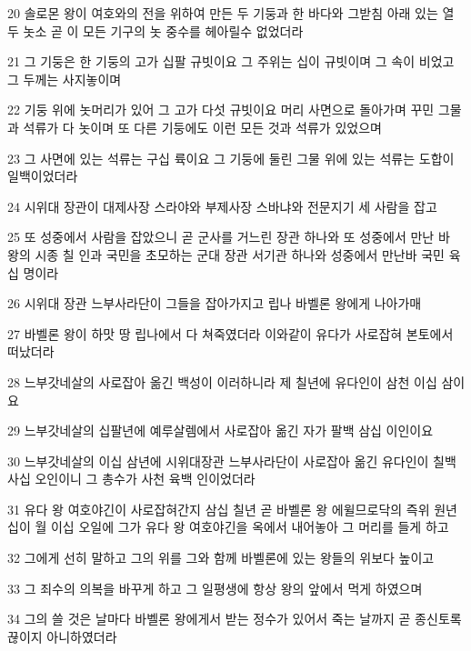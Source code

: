 \par 20 솔로몬 왕이 여호와의 전을 위하여 만든 두 기둥과 한 바다와 그받침 아래 있는 열 두 놋소 곧 이 모든 기구의 놋 중수를 헤아릴수 없었더라
\par 21 그 기둥은 한 기둥의 고가 십팔 규빗이요 그 주위는 십이 규빗이며 그 속이 비었고 그 두께는 사지놓이며
\par 22 기둥 위에 놋머리가 있어 그 고가 다섯 규빗이요 머리 사면으로 돌아가며 꾸민 그물과 석류가 다 놋이며 또 다른 기둥에도 이런 모든 것과 석류가 있었으며
\par 23 그 사면에 있는 석류는 구십 륙이요 그 기둥에 둘린 그물 위에 있는 석류는 도합이 일백이었더라
\par 24 시위대 장관이 대제사장 스라야와 부제사장 스바냐와 전문지기 세 사람을 잡고
\par 25 또 성중에서 사람을 잡았으니 곧 군사를 거느린 장관 하나와 또 성중에서 만난 바 왕의 시종 칠 인과 국민을 초모하는 군대 장관 서기관 하나와 성중에서 만난바 국민 육십 명이라
\par 26 시위대 장관 느부사라단이 그들을 잡아가지고 립나 바벨론 왕에게 나아가매
\par 27 바벨론 왕이 하맛 땅 립나에서 다 쳐죽였더라 이와같이 유다가 사로잡혀 본토에서 떠났더라
\par 28 느부갓네살의 사로잡아 옮긴 백성이 이러하니라 제 칠년에 유다인이 삼천 이십 삼이요
\par 29 느부갓네살의 십팔년에 예루살렘에서 사로잡아 옮긴 자가 팔백 삼십 이인이요
\par 30 느부갓네살의 이십 삼년에 시위대장관 느부사라단이 사로잡아 옮긴 유다인이 칠백 사십 오인이니 그 총수가 사천 육백 인이었더라
\par 31 유다 왕 여호야긴이 사로잡혀간지 삼십 칠년 곧 바벨론 왕 에윌므로닥의 즉위 원년 십이 월 이십 오일에 그가 유다 왕 여호야긴을 옥에서 내어놓아 그 머리를 들게 하고
\par 32 그에게 선히 말하고 그의 위를 그와 함께 바벨론에 있는 왕들의 위보다 높이고
\par 33 그 죄수의 의복을 바꾸게 하고 그 일평생에 항상 왕의 앞에서 먹게 하였으며
\par 34 그의 쓸 것은 날마다 바벨론 왕에게서 받는 정수가 있어서 죽는 날까지 곧 종신토록 끊이지 아니하였더라


